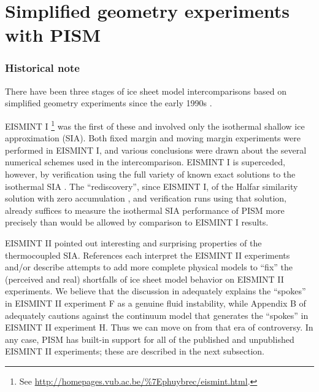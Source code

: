 \documentclass[11pt,final]{amsart}
\begin{document}
\clearpage\newpage
\section{Simplified geometry experiments with PISM}\label{sect:simp}

\subsubsection*{Historical note}  There have been three stages of ice sheet model intercomparisons based on simplified geometry experiments since the early 1990s \cite{BuelerSpray}.

EISMINT I \cite[ European Ice Sheet Modeling INiTiative]{EISMINT96}\footnote{See \url{http://homepages.vub.ac.be/\%7Ephuybrec/eismint.html}.} was the first of these and involved only the isothermal shallow ice approximation (SIA).  Both fixed margin and moving margin experiments were performed in EISMINT I, and various conclusions were drawn about the several numerical schemes used in the intercomparison.  EISMINT I is superceded, however, by verification using the full variety of known exact solutions to the isothermal SIA \cite{BLKCB}.  The ``rediscovery'', since EISMINT I, of the Halfar similarity solution with zero accumulation \cite{Halfar83}, and verification runs using that solution, already suffices to measure the isothermal SIA performance of PISM more precisely than would be allowed by comparison to EISMINT I results.

EISMINT II \cite{EISMINT00} pointed out interesting and surprising properties of the thermocoupled SIA.  References \cite{BBL,Hindmarsh04,Hindmarsh06,PayneBaldwin,SaitoEISMINT,BBssasliding} each interpret the EISMINT II experiments and/or describe attempts to add more complete physical models to ``fix'' the (perceived and real) shortfalls of ice sheet model behavior on EISMINT II experiments.  We believe that the discussion in \cite{PayneDongelmans,PayneBaldwin,BBL} adequately explains the ``spokes'' in EISMINT II experiment F as a genuine fluid instability, while Appendix B of \cite{BBssasliding} adequately cautions against the continuum model that generates the ``spokes'' in EISMINT II experiment H.   Thus we can move on from that era of controversy.  In any case, PISM has built-in support for all of the published and unpublished EISMINT II experiments; these are described in the next subsection.
\end{document}
